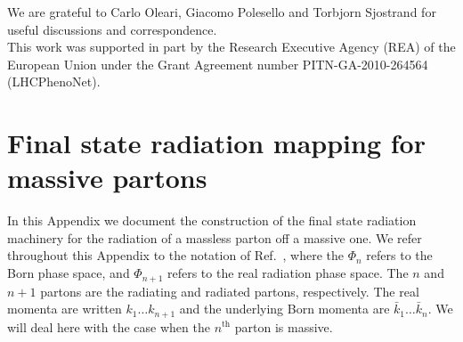 \documentclass[11pt,a4paper]{article}
\newcommand{\tmop}[1]{\ensuremath{\operatorname{#1}}}
\newcommand{\tmtexttt}[1]{{\ttfamily{#1}}}
\begin{document}
\acknowledgments
We are grateful to Carlo Oleari, Giacomo Polesello and Torbjorn Sjostrand for useful discussions and correspondence. \\
This work was supported in part 
by the Research Executive Agency (REA) of the European Union under the Grant Agreement number PITN-GA-2010-264564 (LHCPhenoNet).


\appendix

\newcommand{\tmtextrm}[1]{{\rmfamily{#1}}}

\section{Final state radiation mapping for massive partons} \label{sec:fsr}

In this Appendix we document the construction of the final state radiation
machinery for the radiation of a massless parton off a massive one. We refer
throughout this Appendix to the notation of Ref.~{\cite{Frixione:2007vw}},
where the $\Phi_n$ refers to the Born phase space, and $\Phi_{n + 1}$ refers
to the real radiation phase space. The $n$ and $n + 1$ partons are the
radiating and radiated partons, respectively. The real momenta are written $k_1
\ldots k_{n + 1}$ and the underlying Born momenta are $\bar{k}_1 \ldots
\bar{k}_n$. We will deal here with the case when the $n^{\tmop{th}}$ parton is
massive.
\end{document}
